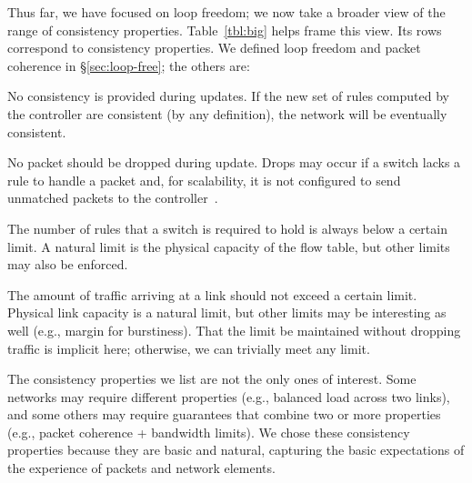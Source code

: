Thus far, we have focused on loop freedom; we now take a broader view of the range of consistency properties. Table~\ref{tbl:big} helps frame this view. Its rows correspond to consistency properties. We defined loop freedom and packet coherence in \S\ref{sec:loop-free}; the others are:

 No consistency is provided during updates. If the new set of rules computed by the controller are consistent (by any definition), the network will be eventually consistent.

 No packet should be dropped during update. Drops may occur if a switch lacks a rule to handle a packet and, for scalability, it is not configured to send unmatched packets to the controller~\cite{swan,b4}.



 The number of rules that a switch is required to hold is always below a certain limit. A natural limit is the physical capacity of the flow table, but other limits may also be enforced.

 The amount of traffic arriving at a link should not exceed a certain limit. Physical link capacity is a natural limit, but other limits may be interesting as well (e.g., margin for burstiness). That the limit be maintained without dropping traffic is implicit here; otherwise, we can trivially meet any limit.

The consistency properties we list are not the only ones of interest.
Some networks may require different properties (e.g., balanced load across two links), and some others may require  guarantees that combine two or more properties (e.g., packet coherence + bandwidth limits). We chose these consistency properties because they are basic and natural, capturing the basic expectations of the experience of packets and network elements.

